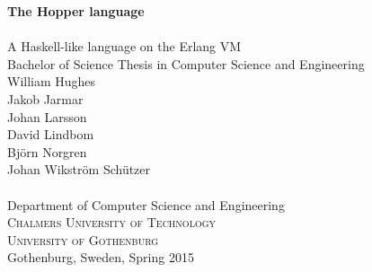 
\begin{titlepage}
			
\addtolength{\voffset}{2cm}


\mbox{}
\vfill
\renewcommand{\familydefault}{\sfdefault} \normalfont %
\textbf{{\Huge	The Hopper language 	\\[0.2cm] 
				}} 	\\[0.5cm]
{\Large A Haskell-like language on the Erlang VM}\\[0.5cm]
Bachelor of Science Thesis in Computer Science and Engineering \\[0.5cm]

{\Large 
  William Hughes \\
  Jakob Jarmar   \\
  Johan Larsson \\
  David Lindbom \\
  Björn Norgren \\
  Johan Wikström Schützer \\
  }\\[2.0cm]


Department of Computer Science and Engineering \\
\textsc{Chalmers University of Technology} \\
\textsc{University of Gothenburg} \\
Gothenburg, Sweden, Spring 2015

\renewcommand{\familydefault}{\rmdefault} \normalfont %
\end{titlepage}


\newpage
\restoregeometry
\thispagestyle{empty}
\mbox{}


